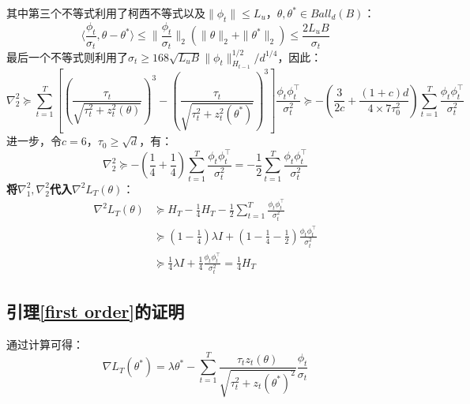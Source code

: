 \documentclass[UTF8,a4paper,10.5pt]{ctexart}
\begin{document}
其中第三个不等式利用了柯西不等式以及$\|\phi_t\|\leq L_u$，$\theta,\theta^*\in Ball_d(B)$：
\begin{equation*}
	\langle\frac{\phi_t}{\sigma_t},\theta - \theta^*\rangle\leq \|\frac{\phi_t}{\sigma_t}\|_2(\|\theta\|_2+\|\theta^*\|_2)\leq \frac{2L_uB}{\sigma_t}
\end{equation*}
最后一个不等式则利用了$\sigma_t\geq 168 \sqrt{L_uB}\|\phi_t\|_{H_{t-1}}^{1/2}/d^{1/4}$，因此：
\begin{equation}
	\nabla^2_2 \succeq \sum_{t=1}^T\left[\left(\frac{\tau_t}{\sqrt{\tau_t^2 + z_t^2(\theta)}}\right)^3 - \left(\frac{\tau_t}{\sqrt{\tau_t^2 + z_t^2(\theta^*)}}\right)^3 \right]\frac{\phi_t\phi_t^\top}{\sigma_t^2} \succeq - \left(\frac{3}{2c} +\frac{(1+c)d}{4\times 7\tau_0^2}\right)\sum_{t=1}^T\frac{\phi_t\phi_t^\top}{\sigma_t^2}
\end{equation}
进一步，令$c=6$，$\tau_0 \geq \sqrt{d}$，有：
\begin{equation}
	\nabla^2_2 \succeq -\left(\frac{1}{4} + \frac{1}{4}\right)\sum_{t=1}^T\frac{\phi_t\phi_t^\top}{\sigma_t^2} = -\frac{1}{2}\sum_{t=1}^T\frac{\phi_t\phi_t^\top}{\sigma_t^2}
\end{equation}
\textbf{将$\nabla_1^2,\nabla_2^2$代入$\nabla^2 L_T(\theta)$}：
\begin{align*}
	\nabla^2L_T(\theta) &\succeq H_T - \frac{1}{4}H_T -\frac{1}{2}\sum_{t=1}^T\frac{\phi_t\phi_t^\top}{\sigma_t^2} \\
	&\succeq \left(1-\frac{1}{4}\right) \lambda I +(1-\frac{1}{4}-\frac{1}{2})\frac{\phi_t\phi_t^\top}{\sigma_t^2} \\
	& \succeq \frac{1}{4}\lambda I +\frac{1}{4}\frac{\phi_t\phi_t^\top}{\sigma_t^2} = \frac{1}{4}H_T 
\end{align*}

\subsection{引理\ref{first order}的证明}
通过计算可得：
\begin{equation*}
	\nabla L_T(\theta^*) = \lambda \theta^* - \sum_{t=1}^T\frac{\tau_t z_t(\theta)}{\sqrt{\tau_t^2 + z_t(\theta^*)^2}}\frac{\phi_t}{\sigma_t}
\end{equation*} 
\end{document}
